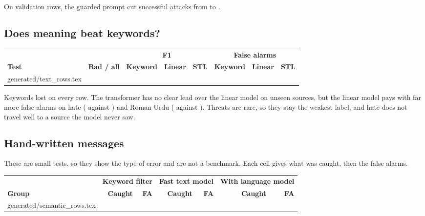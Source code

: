 \documentclass[11pt,a4paper]{article}
\makeatletter
\newcommand{\need}[1][10]{\Needspace{#1\baselineskip}}
\newcommand{\tablerows}[1]{\@@input #1 }
\makeatother
\begin{document}
On validation rows, the guarded prompt cut successful attacks from \attackCalm{} to \attackGuard{}.

\need[14]
\subsection*{Does meaning beat keywords?}

\begin{center}
\small
\setlength{\tabcolsep}{4pt}
\begin{tabular}{@{}lrrrrrrr@{}}
\toprule
 & & \multicolumn{3}{c}{\textbf{F1}} & \multicolumn{3}{c}{\textbf{False alarms}} \\
\textbf{Test} & \textbf{Bad / all} & \textbf{Keyword} & \textbf{Linear} & \textbf{STL} & \textbf{Keyword} & \textbf{Linear} & \textbf{STL} \\
\midrule
\tablerows{generated/text_rows.tex}
\bottomrule
\end{tabular}
\end{center}

Keywords lost on every row. The transformer has no clear lead over the linear model on unseen sources, but the linear model pays with far more false alarms on hate (\hateUnseenLinearFA{} against \hateUnseenFA{}) and Roman Urdu (\urduLinearFA{} against \urduFA{}). Threats are rare, so they stay the weakest label, and hate does not travel well to a source the model never saw.

\need[12]
\subsection*{Hand-written messages}

These are small tests, so they show the type of error and are not a benchmark. Each cell gives what was caught, then the false alarms.

\begin{center}
\small
\setlength{\tabcolsep}{4pt}
\begin{tabular}{@{}lrrrrrr@{}}
\toprule
 & \multicolumn{2}{c}{\textbf{Keyword filter}} & \multicolumn{2}{c}{\textbf{Fast text model}} & \multicolumn{2}{c}{\textbf{With language model}} \\
\textbf{Group} & \textbf{Caught} & \textbf{FA} & \textbf{Caught} & \textbf{FA} & \textbf{Caught} & \textbf{FA} \\
\midrule
\tablerows{generated/semantic_rows.tex}
\bottomrule
\end{tabular}
\end{center}
\end{document}
